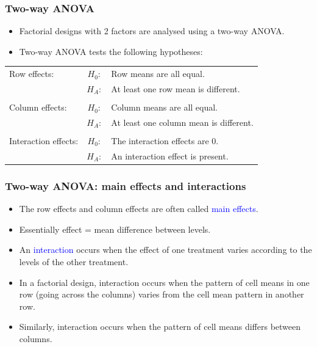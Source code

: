 \documentclass[12pt,xcolor=dvipsnames,handout,mathserif,aspectratio=169]{beamer}
\newcommand{\tc}{\textcolor}
\begin{document}
\begin{frame}
\frametitle{Two-way ANOVA}
\begin{itemize}
\item Factorial designs with 2 factors are analysed using a two-way ANOVA.
\vspace{0.2cm}
\item Two-way ANOVA tests the following hypotheses:
\end{itemize}
\begin{center}
\begin{tabular}{lcl}
Row effects: & $H_0:$ & Row means are all equal.\\
                       & $H_A:$ & At least one row mean is different.\\
                        & & \\
Column effects: & $H_0:$ & Column means are all equal.\\
                       & $H_A:$ & At least one column mean is different.\\
                        & & \\
Interaction effects: & $H_0:$ & The interaction effects are 0.\\
                       & $H_A:$ & An interaction effect is present.\\
\end{tabular}
\end{center}
\end{frame}


\begin{frame}
\frametitle{Two-way ANOVA: main effects and interactions}
\begin{itemize}
\item The row effects and column effects are often called \tc{blue}{main effects}.
\vspace{0.3cm}
\item Essentially effect = mean difference between levels.
\vspace{0.3cm}
\item An \tc{blue}{interaction} occurs when the effect of one treatment varies according to the levels of the other treatment.
\vspace{0.3cm}
\item In a factorial design, interaction occurs when the pattern of cell means in one row (going across the columns) varies from the cell mean pattern in another row.
\vspace{0.3cm}
\item Similarly, interaction occurs when the pattern of cell means differs between columns.
\end{itemize}
\end{frame}
\end{document}
